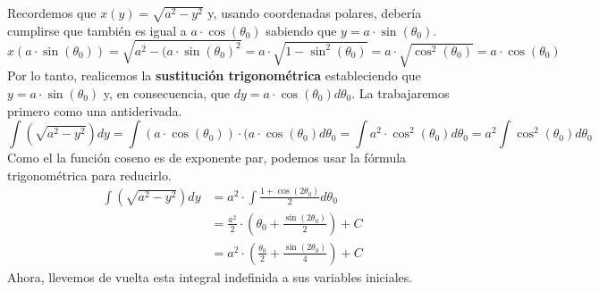 \documentclass[12pt]{article}
\begin{document}
Recordemos que $x(y) = \sqrt{a^{2} - y^{2}}$ y, usando coordenadas polares, debería cumplirse que también es igual a $a \cdot \cos(\theta_{0})$ sabiendo que $y = a \cdot \sin(\theta_{0})$.
\[
  x(a \cdot \sin(\theta_{0})) = \sqrt{a^{2} - (a \cdot \sin(\theta_{0})^{2}}
                              = a \cdot \sqrt{1 - \sin^{2}(\theta_{0})}
                              = a \cdot \sqrt{\cos^{2}(\theta_{0})}
                              = a \cdot \cos(\theta_{0})
\]
Por lo tanto, realicemos la \textbf{sustitución trigonométrica} estableciendo que $y = a \cdot \sin(\theta_{0})$ y, en consecuencia, que $dy = a \cdot \cos(\theta_{0}) d\theta_{0}$. La trabajaremos primero como una antiderivada.
\[
  \int \left(\sqrt{a^{2} - y^{2}}\right) dy = \int (a \cdot \cos(\theta_{0})) \cdot (a \cdot \cos(\theta_{0}) d\theta_{0}
                                            = \int a^{2} \cdot \cos^{2}(\theta_{0}) d\theta_{0}
                                            = a^{2} \int \cos^{2}(\theta_{0}) d\theta_{0}
\]
Como el la función coseno es de exponente par, podemos usar la fórmula trigonométrica para reducirlo.
\begin{align*}
  \int \left(\sqrt{a^{2} - y^{2}}\right) dy &= a^{2} \cdot \int \frac{1 + \cos(2\theta_{0})}{2} d\theta_{0} \\
                                            &= \frac{a^{2}}{2} \cdot \left(\theta_{0} + \frac{\sin(2\theta_{0})}{2}\right) + C \\
                                            &= a^{2} \cdot \left(\frac{\theta_{0}}{2} + \frac{\sin(2\theta_{0})}{4}\right) + C
\end{align*}
Ahora, llevemos de vuelta esta integral indefinida a sus variables iniciales.
\end{document}
